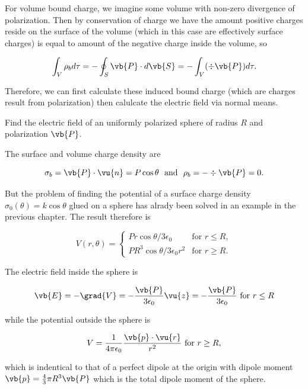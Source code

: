 \documentclass[english,a4paper,12pt]{report}
\begin{document}
For volume bound charge, we imagine some volume with non-zero divergence of polarization. Then by conservation of charge we have the amount positive charges reside on the surface of the volume (which in this case are effectively surface charges) is equal to amount of the negative charge inside the volume, so

\begin{equation}
    \int_{V}^{} \rho _{b} d\tau = - \oint_{S} \vb{P} \cdot d\vb{S} = - \int_{V}^{} (\div{\vb{P} } )d\tau . 
\end{equation}

Therefore, we can first calculate these induced bound charge (which are charges result from polarization) then calulcate the electric field via normal means.

{Find the electric field of an uniformly polarized sphere of radius \(R\) and polarization \(\vb{P} \).}
{The surface and volume charge density are

\begin{equation}
    \sigma _{b} = \vb{P} \cdot \vu{n} = P\cos \theta  ~\text { and }~ \rho _{b} = - \div{\vb{P} } = 0.  
\end{equation}

But the problem of finding the potential of a surface charge density \(\sigma _{0} (\theta ) = k\cos \theta  \) glued on a sphere has alrady been solved in an example in the previous chapter. The result therefore is

\begin{equation}
 V(r, \theta) =
    \begin{cases}
    Pr \cos \theta / 3\epsilon _{0}  & \text{for } r \leq R, \\[10pt]
    PR^3 \cos \theta /3\epsilon _{0}r^2  & \text{for } r \geq R.
    \end{cases}  
\end{equation}

The electric field inside the sphere is 

\begin{equation}
    \vb{E} = -\grad{V} = - \frac{\vb{P} }{3\epsilon _{0} }\vu{z} = - \frac{\vb{P} }{3 \epsilon _{0} } \text{ for } r \le R
\end{equation}

while the potential outside the sphere is 

\begin{equation}
    V = \frac{1}{4\pi \epsilon_0} \frac{\vb{p} \cdot \vu{r} }{r^2} \text{ for } r \ge R, 
\end{equation}

which is indentical to that of a perfect dipole at the origin with dipole moment \(\vb{p} = \frac{4}{3}\pi R^3 \vb{P}  \) which is the total dipole moment of the sphere. 
} 
\end{document}
